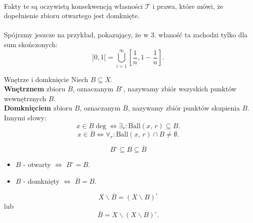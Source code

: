 \documentclass{article}
\numberwithin{defi}{section}
\numberwithin{theo}{section}
\numberwithin{defi}{section}
\newcommand{\oo}{\infty}
\newcommand{\Tau}{\mathcal{T}}
\newcommand{\dg}{^{\circ}}
\newcommand{\ball}[2]{\text{Ball}(#1, \, #2)}
\begin{document}
\paragraph{} Fakty te są oczywistą konsekwencją własności $\Tau$ i prawa, które mówi, że dopełnienie zbioru otwartego jest domknięte.
\paragraph{} Spójrzmy jeszcze na przykład, pokazujący, że w 3. właność ta zachodzi tylko dla sum skończonych: \begin{equation*}
    ]0, 1[ = \bigcup_{i=1}^{\oo} [\frac{1}{n}, 1-\frac{1}{n}].
\end{equation*}

\begin{defr}{Wnętrze i domknięcie}
    Niech $B \subseteq X$.\\
    \textbf{Wnętrznem} zbioru $B$, oznaczanym $B \dg$, nazywamy zbiór wszyskich punktów wewnętrznych $B$.\\
    \textbf{Domknięciem} zbioru $B$, oznaczanym $\overline{B}$, nazywamy zbiór punktów skupienia $B$. \\
    Innymi słowy: \begin{equation}
        x \in B \deg \iff \exists_r: \ball{x}{r} \subseteq B.
    \end{equation} \begin{equation}
        x \in \overline{B} \iff \forall_r: \ball{x}{r} \cap B \neq \emptyset.
    \end{equation}
\end{defr}

\begin{obs}{}
    \begin{equation}
        B \dg \subseteq B \subseteq \overline{B}
    \end{equation}
\end{obs}

\begin{obs}{}
    \begin{itemize}
        \item $B$ - otwarty $\iff$ $B \dg = B.$
        \item $B$ - domknięty $\iff$ $\overline{B} = B.$
    \end{itemize}
\end{obs}

\begin{twier}{}
    \begin{equation}
        X \backslash \overline{B} = (X \backslash B) \dg
    \end{equation} lub \begin{equation}
        \overline{B} = X \backslash (X \backslash B) \dg.
    \end{equation}
\end{twier}
\end{document}
